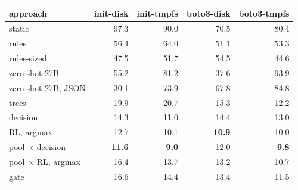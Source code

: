 \begin{tabular}{@{}lrrrr@{}}
\toprule
approach & init-disk & init-tmpfs & boto3-disk & boto3-tmpfs \\
\midrule
static & 97.3 & 90.0 & 70.5 & 80.4 \\
rules & 56.4 & 64.0 & 51.1 & 53.3 \\
rules-sized & 47.5 & 51.7 & 54.5 & 44.6 \\
zero-shot 27B & 55.2 & 81.2 & 37.6 & 93.9 \\
zero-shot 27B, JSON & 30.1 & 73.9 & 67.8 & 84.8 \\
trees & 19.9 & 20.7 & 15.3 & 12.2 \\
decision & 14.3 & 11.0 & 14.4 & 13.0 \\
RL, argmax & 12.7 & 10.1 & \textbf{10.9} & 10.0 \\
pool $\times$ decision & \textbf{11.6} & \textbf{9.0} & 12.0 & \textbf{9.8} \\
pool $\times$ RL, argmax & 16.4 & 13.7 & 13.2 & 10.7 \\
gate & 16.6 & 14.4 & 13.4 & 11.5 \\
\bottomrule
\end{tabular}
